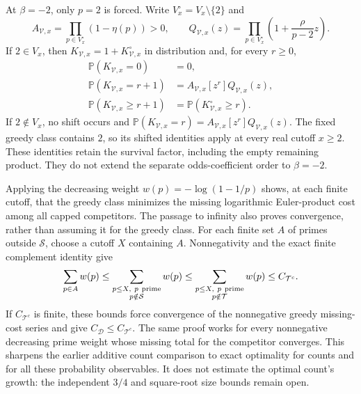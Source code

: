 \documentclass[11pt]{article}
\theoremstyle{definition}
\begin{document}
At \(\beta=-2\), only \(p=2\) is forced.
Write \(V_x^\circ=V_x\setminus\{2\}\) and
\[
 A_{\mathcal V,x}
    =\prod_{p\in V_x^\circ}(1-\eta(p))>0,\qquad
 Q_{\mathcal V,x}(z)
    =\prod_{p\in V_x^\circ}\left(1+\frac{\rho}{p-2}z\right).
\]
If \(2\in V_x\), then \(K_{\mathcal V,x}=1+K^\circ_{\mathcal V,x}\)
in distribution and, for every \(r\ge0\),
\[
 \begin{aligned}
 \mathbb P(K_{\mathcal V,x}=0)&=0,\\
 \mathbb P(K_{\mathcal V,x}=r+1)
      &=A_{\mathcal V,x}[z^r]Q_{\mathcal V,x}(z),\\
 \mathbb P(K_{\mathcal V,x}\ge r+1)
      &=\mathbb P(K^\circ_{\mathcal V,x}\ge r).
 \end{aligned}
\]
If \(2\notin V_x\), no shift occurs and
\(\mathbb P(K_{\mathcal V,x}=r)=A_{\mathcal V,x}[z^r]Q_{\mathcal V,x}(z)\).
The fixed greedy class contains \(2\), so its shifted identities apply
at every real cutoff \(x\ge2\).
These identities retain the survival factor, including the empty
remaining product. They do not extend the separate odds-coefficient
order to \(\beta=-2\).

Applying the decreasing weight \(w(p)=-\log(1-1/p)\) shows, at each
finite cutoff, that the greedy class minimizes the missing
logarithmic Euler-product cost among all capped competitors.
The passage to infinity also proves convergence, rather than assuming it
for the greedy class. For each finite set \(A\) of primes outside
\(\mathcal S\), choose a cutoff \(X\) containing \(A\). Nonnegativity and
the exact finite complement identity give
\[
 \sum_{p\in A}w(p)
 \le\sum_{\substack{p\le X,\ p\ {\rm prime}\\p\notin\mathcal S}}w(p)
 \le\sum_{\substack{p\le X,\ p\ {\rm prime}\\p\notin\mathcal T}}w(p)
 \le C_{\mathcal T^c}.
\]
If \(C_{\mathcal T^c}\) is finite, these bounds force convergence of the
nonnegative greedy missing-cost series and give
\(C_{\mathcal D}\le C_{\mathcal T^c}\).
The same proof works for every nonnegative decreasing prime weight
whose missing total for the competitor converges.
This sharpens the earlier additive count comparison to exact
optimality for counts and for all these probability observables.
It does not estimate the optimal count's growth:
the independent $3/4$ and square-root size bounds remain open.
\end{document}
